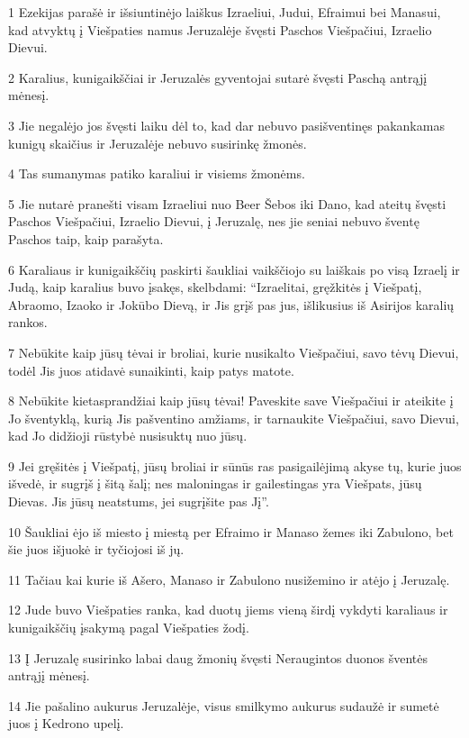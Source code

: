 \par 1 Ezekijas parašė ir išsiuntinėjo laiškus Izraeliui, Judui, Efraimui bei Manasui, kad atvyktų į Viešpaties namus Jeruzalėje švęsti Paschos Viešpačiui, Izraelio Dievui. 
\par 2 Karalius, kunigaikščiai ir Jeruzalės gyventojai sutarė švęsti Paschą antrąjį mėnesį. 
\par 3 Jie negalėjo jos švęsti laiku dėl to, kad dar nebuvo pasišventinęs pakankamas kunigų skaičius ir Jeruzalėje nebuvo susirinkę žmonės. 
\par 4 Tas sumanymas patiko karaliui ir visiems žmonėms. 
\par 5 Jie nutarė pranešti visam Izraeliui nuo Beer Šebos iki Dano, kad ateitų švęsti Paschos Viešpačiui, Izraelio Dievui, į Jeruzalę, nes jie seniai nebuvo šventę Paschos taip, kaip parašyta. 
\par 6 Karaliaus ir kunigaikščių paskirti šaukliai vaikščiojo su laiškais po visą Izraelį ir Judą, kaip karalius buvo įsakęs, skelbdami: “Izraelitai, gręžkitės į Viešpatį, Abraomo, Izaoko ir Jokūbo Dievą, ir Jis grįš pas jus, išlikusius iš Asirijos karalių rankos. 
\par 7 Nebūkite kaip jūsų tėvai ir broliai, kurie nusikalto Viešpačiui, savo tėvų Dievui, todėl Jis juos atidavė sunaikinti, kaip patys matote. 
\par 8 Nebūkite kietasprandžiai kaip jūsų tėvai! Paveskite save Viešpačiui ir ateikite į Jo šventyklą, kurią Jis pašventino amžiams, ir tarnaukite Viešpačiui, savo Dievui, kad Jo didžioji rūstybė nusisuktų nuo jūsų. 
\par 9 Jei gręšitės į Viešpatį, jūsų broliai ir sūnūs ras pasigailėjimą akyse tų, kurie juos išvedė, ir sugrįš į šitą šalį; nes maloningas ir gailestingas yra Viešpats, jūsų Dievas. Jis jūsų neatstums, jei sugrįšite pas Jį”. 
\par 10 Šaukliai ėjo iš miesto į miestą per Efraimo ir Manaso žemes iki Zabulono, bet šie juos išjuokė ir tyčiojosi iš jų. 
\par 11 Tačiau kai kurie iš Ašero, Manaso ir Zabulono nusižemino ir atėjo į Jeruzalę. 
\par 12 Jude buvo Viešpaties ranka, kad duotų jiems vieną širdį vykdyti karaliaus ir kunigaikščių įsakymą pagal Viešpaties žodį. 
\par 13 Į Jeruzalę susirinko labai daug žmonių švęsti Neraugintos duonos šventės antrąjį mėnesį. 
\par 14 Jie pašalino aukurus Jeruzalėje, visus smilkymo aukurus sudaužė ir sumetė juos į Kedrono upelį. 
